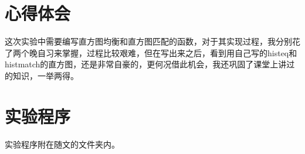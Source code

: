 \documentclass[]{IEEEphot}
\begin{document}
\section{心得体会}
这次实验中需要编写直方图均衡和直方图匹配的函数，对于其实现过程，我分别花了两个晚自习来掌握，过程比较艰难，但在写出来之后，看到用自己写的histeq和histmatch的直方图，还是非常自豪的，更何况借此机会，我还巩固了课堂上讲过的知识，一举两得。
\section{实验程序}
实验程序附在随文的文件夹内。
\end{document}
